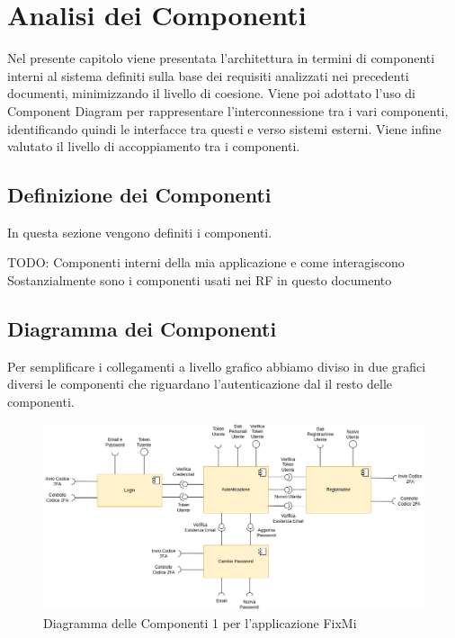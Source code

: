 \documentclass{report}
\begin{document}
\chapter{Analisi dei Componenti}
Nel presente capitolo viene presentata l’architettura in termini di componenti interni al sistema definiti sulla base dei requisiti analizzati nei precedenti documenti, minimizzando il livello di coesione. Viene poi adottato l’uso di Component Diagram per rappresentare l’interconnessione tra i vari componenti, identificando quindi le interfacce tra questi e verso sistemi esterni. Viene infine valutato il livello di accoppiamento tra i componenti.


\section{Definizione dei Componenti}
In questa sezione vengono definiti i componenti.


TODO: Componenti interni della mia applicazione e come interagiscono\\
Sostanzialmente sono i componenti usati nei RF in questo documento



\section{Diagramma dei Componenti}

Per semplificare i collegamenti a livello grafico abbiamo diviso in due grafici diversi le componenti che riguardano l'autenticazione dal il resto delle componenti.

\begin{figure}[H]
	\centering\includegraphics[width=1\textwidth]{images/autenticazione_diagramma_dei_componenti.png}
	Diagramma delle Componenti 1 per l'applicazione FixMi
\end{figure}
\end{document}
